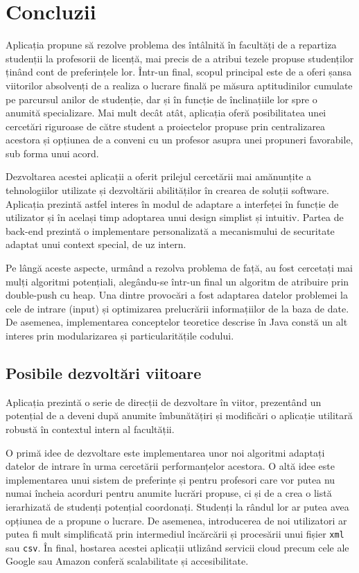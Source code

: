 \chapter*{Concluzii} 

Aplicația \thesistitle{} propune să rezolve problema des întâlnită în facultăți de a repartiza studenții la profesorii de licență, mai precis de a atribui tezele propuse studenților ținând cont de preferințele lor. Într-un final, scopul principal este de a oferi șansa viitorilor absolvenți de a realiza o lucrare finală pe măsura aptitudinilor cumulate pe parcursul anilor de studenție, dar și în funcție de înclinațiile lor spre o anumită specializare. Mai mult decât atât, aplicația oferă posibilitatea unei cercetări riguroase de către student a proiectelor propuse prin centralizarea acestora și opțiunea de a conveni cu un profesor asupra unei propuneri favorabile, sub forma unui acord.

Dezvoltarea acestei aplicații a oferit prilejul cercetării mai amănunțite a tehnologiilor utilizate și dezvoltării abilităților în crearea de soluții software. Aplicația prezintă astfel interes în modul de adaptare a interfeței în funcție de utilizator și în același timp adoptarea unui design simplist și intuitiv. Partea de back-end prezintă o implementare personalizată a mecanismului de securitate adaptat unui context special, de uz intern.

Pe lângă aceste aspecte, urmând a rezolva problema de față, au fost cercetați mai mulți algoritmi potențiali, alegându-se într-un final un algoritm de atribuire prin double-push cu heap. Una dintre provocări a fost adaptarea datelor problemei la cele de intrare (input) și optimizarea prelucrării informațiilor de la baza de date. De asemenea, implementarea conceptelor teoretice descrise în Java constă un alt interes prin modularizarea și particularitățile codului.

\section*{Posibile dezvoltări viitoare}

Aplicația prezintă o serie de direcții de dezvoltare în viitor, prezentând un potențial de a deveni după anumite îmbunătățiri și modificări o aplicație utilitară robustă în contextul intern al facultății.

O primă idee de dezvoltare este implementarea unor noi algoritmi adaptați datelor de intrare în urma cercetării performanțelor acestora. O altă idee este implementarea unui sistem de preferințe și pentru profesori care vor putea nu numai încheia acorduri pentru anumite lucrări propuse, ci și de a crea o listă ierarhizată de studenți potențial coordonați. Studenți la rândul lor ar putea avea opțiunea de a propune o lucrare. De asemenea, introducerea de noi utilizatori ar putea fi mult simplificată prin intermediul încărcării și procesării unui fișier \texttt{xml} sau \texttt{csv}. În final, hostarea acestei aplicații utlizând servicii cloud precum cele ale Google sau Amazon conferă scalabilitate și accesibilitate.